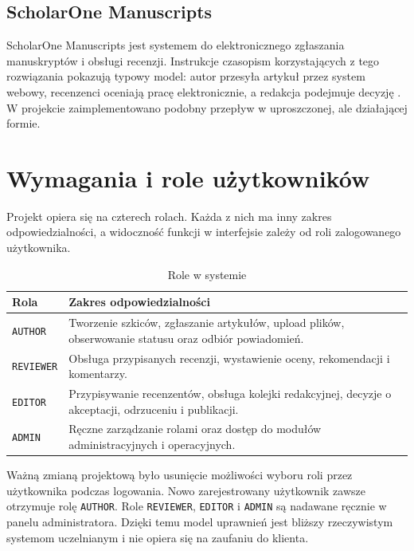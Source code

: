 \documentclass[times]{san}
\begin{document}
\subsection{ScholarOne Manuscripts}

ScholarOne Manuscripts jest systemem do elektronicznego zgłaszania manuskryptów i obsługi recenzji. Instrukcje czasopism korzystających z tego rozwiązania pokazują typowy model: autor przesyła artykuł przez system webowy, recenzenci oceniają pracę elektronicznie, a redakcja podejmuje decyzję \cite{cdc_scholarone}. W projekcie zaimplementowano podobny przepływ w uproszczonej, ale działającej formie.

\section{Wymagania i role użytkowników}

Projekt opiera się na czterech rolach. Każda z nich ma inny zakres odpowiedzialności, a widoczność funkcji w interfejsie zależy od roli zalogowanego użytkownika.

\begin{table}[!htbp]
\centering
\caption{Role w systemie}
\label{tab:roles}
\begin{tabular}{|p{}|p{}|}
\hline
Rola & Zakres odpowiedzialności \\
\hline
\texttt{AUTHOR} & Tworzenie szkiców, zgłaszanie artykułów, upload plików, obserwowanie statusu oraz odbiór powiadomień. \\
\hline
\texttt{REVIEWER} & Obsługa przypisanych recenzji, wystawienie oceny, rekomendacji i komentarzy. \\
\hline
\texttt{EDITOR} & Przypisywanie recenzentów, obsługa kolejki redakcyjnej, decyzje o akceptacji, odrzuceniu i publikacji. \\
\hline
\texttt{ADMIN} & Ręczne zarządzanie rolami oraz dostęp do modułów administracyjnych i operacyjnych. \\
\hline
\end{tabular}
\end{table}

Ważną zmianą projektową było usunięcie możliwości wyboru roli przez użytkownika podczas logowania. Nowo zarejestrowany użytkownik zawsze otrzymuje rolę \texttt{AUTHOR}. Role \texttt{REVIEWER}, \texttt{EDITOR} i \texttt{ADMIN} są nadawane ręcznie w panelu administratora. Dzięki temu model uprawnień jest bliższy rzeczywistym systemom uczelnianym i nie opiera się na zaufaniu do klienta.
\end{document}
